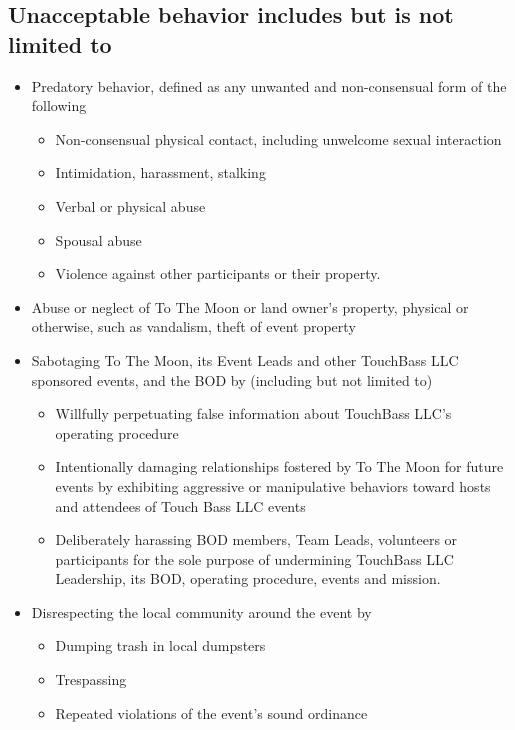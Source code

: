 \subsection*{Unacceptable behavior includes but is not limited to}
\begin{itemize}[noitemsep]
    \item Predatory behavior, defined as any unwanted and non-consensual form of the following
    \begin{itemize}[noitemsep]
        \item Non-consensual physical contact, including unwelcome sexual interaction
        \item Intimidation, harassment, stalking
        \item Verbal or physical abuse
        \item Spousal abuse
        \item Violence against other participants or their property.
	\end{itemize}
         
    \item Abuse or neglect of To The Moon or land owner’s property, physical or otherwise, such as vandalism, theft of event property
     
    \item Sabotaging To The Moon, its Event Leads and other TouchBass LLC sponsored events, and the BOD by (including but not limited to)
    \begin{itemize}[noitemsep]
        \item Willfully perpetuating false information about TouchBass LLC’s operating procedure
        \item Intentionally damaging relationships fostered by To The Moon for future events by exhibiting aggressive or manipulative behaviors toward hosts and attendees of Touch Bass LLC events
        \item Deliberately harassing BOD members, Team Leads, volunteers or participants for the sole purpose of undermining TouchBass LLC Leadership, its BOD,  operating procedure, events and mission.  
	\end{itemize}

	\item Disrespecting the local community around the event by
    \begin{itemize}[noitemsep]
        \item Dumping trash in local dumpsters
        \item Trespassing
        \item Repeated violations of the event’s sound ordinance
    \end{itemize}


\end{itemize}
